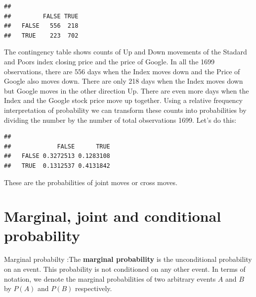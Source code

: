 \documentclass[
]{book}
\newenvironment{Shaded}{\begin{snugshade}}{\end{snugshade}}
\newcommand{\DecValTok}[1]{\textcolor[rgb]{0.00,0.00,0.81}{#1}}
\newcommand{\FunctionTok}[1]{\textcolor[rgb]{0.00,0.00,0.00}{#1}}
\newcommand{\NormalTok}[1]{#1}
\newcommand{\SpecialCharTok}[1]{\textcolor[rgb]{0.00,0.00,0.00}{#1}}
\begin{document}
\begin{verbatim}
##        
##         FALSE TRUE
##   FALSE   556  218
##   TRUE    223  702
\end{verbatim}

The contingency table shows counts of Up and Down movements of the Stadard and Poors index closing
price and the price of Google. In all the 1699 observations, there are 556 days when
the Index moves down and the Price of Google also moves down. There are only 218 days when the
Index moves down but Google moves in the other direction Up. There are even more days when
the Index and the Google stock price move up together. Using a relative frequency interpretation
of probability we can transform these counts into probabilities by dividing the number by the
number of total observations 1699. Let's do this:

\begin{Shaded}
\end{Shaded}

\begin{verbatim}
##        
##             FALSE      TRUE
##   FALSE 0.3272513 0.1283108
##   TRUE  0.1312537 0.4131842
\end{verbatim}

These are the probabilities of joint moves or cross moves.

\hypertarget{marginal-joint-and-conditional-probability}{%
\section{Marginal, joint and conditional probability}\label{marginal-joint-and-conditional-probability}}

Marginal probabilty
:The \textbf{marginal probability} is the unconditional probability on an event. This
probability is not conditioned on any other event. In terms of notation, we
denote the marginal probabilities of two arbitrary events \(A\) and \(B\) by
\(P(A)\) and \(P(B)\) respectively.
\end{document}
